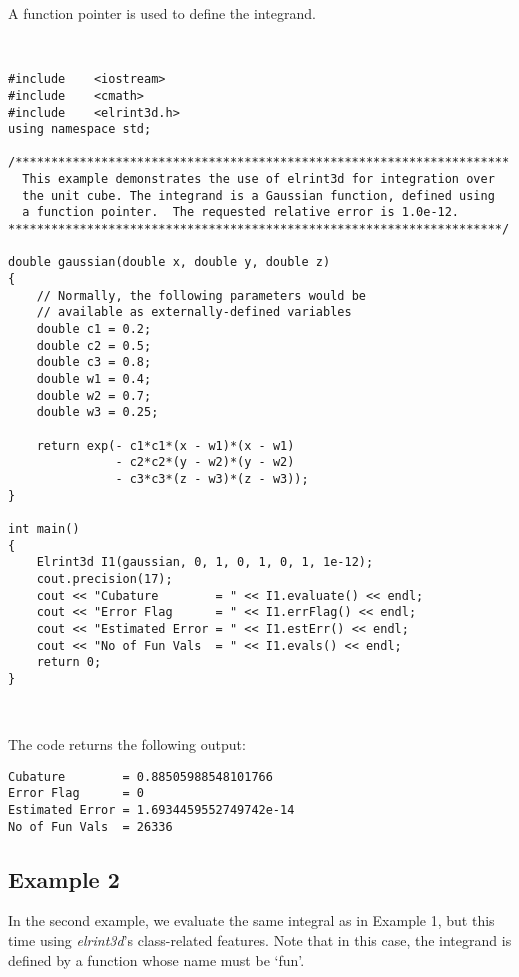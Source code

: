 \documentclass[10pt]{article}
\def \algorithmNoSpace {\textit{elrint3d}}
\begin{document}
A function pointer is used to define the integrand.

\ 

\begin{verbatim}
#include    <iostream>
#include    <cmath>
#include    <elrint3d.h>
using namespace std;

/*********************************************************************
  This example demonstrates the use of elrint3d for integration over
  the unit cube. The integrand is a Gaussian function, defined using
  a function pointer.  The requested relative error is 1.0e-12.
*********************************************************************/

double gaussian(double x, double y, double z)
{
    // Normally, the following parameters would be
    // available as externally-defined variables
    double c1 = 0.2;
    double c2 = 0.5;
    double c3 = 0.8;
    double w1 = 0.4;
    double w2 = 0.7;
    double w3 = 0.25;

    return exp(- c1*c1*(x - w1)*(x - w1)
               - c2*c2*(y - w2)*(y - w2)
               - c3*c3*(z - w3)*(z - w3));
}

int main()
{
    Elrint3d I1(gaussian, 0, 1, 0, 1, 0, 1, 1e-12);
    cout.precision(17);
    cout << "Cubature        = " << I1.evaluate() << endl;
    cout << "Error Flag      = " << I1.errFlag() << endl;
    cout << "Estimated Error = " << I1.estErr() << endl;
    cout << "No of Fun Vals  = " << I1.evals() << endl;
    return 0;
}
\end{verbatim}

\ 

\noindent The code returns the following output:

\begin{verbatim}
Cubature        = 0.88505988548101766
Error Flag      = 0
Estimated Error = 1.6934459552749742e-14
No of Fun Vals  = 26336
\end{verbatim}


\subsection{Example 2}

In the second example, we evaluate the same integral as in Example 1, but this time using {\algorithmNoSpace}'s class-related features.  Note that in this case, the integrand is defined by a function whose name must be `fun'. 

\ 
\end{document}
